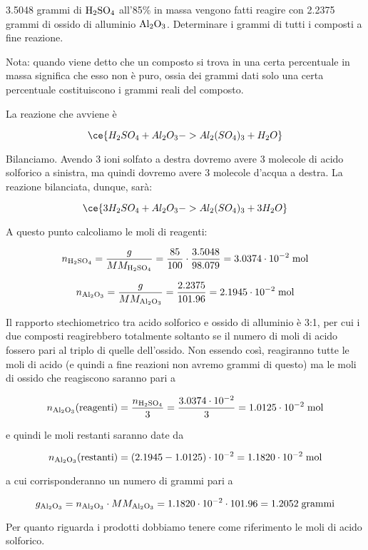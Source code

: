 \begin{esercizio}
    3.5048 grammi di $\rm H_2SO_4$ all'85\% in massa vengono fatti reagire con 2.2375 grammi di ossido di alluminio $\rm Al_2O_3$. Determinare i grammi di tutti i composti a fine reazione.
\end{esercizio}
\begin{soluzione}
    Nota: quando viene detto che un composto si trova in una certa percentuale in massa significa che esso non è puro, ossia dei grammi dati solo una certa percentuale costituiscono i grammi reali del composto.

\vspace{0.2cm}La reazione che avviene è

$$\ce{H_2SO_4 + Al_2O_3 -> Al_2(SO_4)_3 + H_2O}$$

Bilanciamo. Avendo 3 ioni solfato a destra dovremo avere 3 molecole di acido solforico a sinistra, ma quindi dovremo avere 3 molecole d'acqua a destra. La reazione bilanciata, dunque, sarà:

$$\ce{3H_2SO_4 + Al_2O_3 -> Al_2(SO_4)_3 + 3H_2O}$$

A questo punto calcoliamo le moli di reagenti:

$$n_{\rm H_2SO_4}=\frac{g}{MM_{\rm H_2SO_4}}
=\frac{85}{100} \cdot \frac{3.5048}{98.079}=3.0374 \cdot 10^{-2} \; \rm mol$$

$$n_{\rm Al_2O_3}=\frac{g}{MM_{\rm Al_2O_3}}
=\frac{2.2375}{101.96}
=2.1945 \cdot 10^{-2} \; \rm mol$$

Il rapporto stechiometrico tra acido solforico e ossido di alluminio è 3:1, per cui i due composti reagirebbero totalmente soltanto se il numero di moli di acido fossero pari al triplo di quelle dell'ossido. Non essendo così, reagiranno tutte le moli di acido (e quindi a fine reazioni non avremo grammi di questo) ma le moli di ossido che reagiscono saranno pari a

$$n_{\rm Al_2O_3}(\text{reagenti})
=\frac{n_{\rm H_2SO_4}}{3}
=\frac{3.0374 \cdot 10^{-2}}{3}
=1.0125 \cdot 10^{-2} \; \rm mol$$

e quindi le moli restanti saranno date da

$$n_{\rm Al_2O_3}(\text{restanti})
=(2.1945 - 1.0125) \cdot 10^{-2}
=1.1820 \cdot 10^{-2} \; \rm mol$$

a cui corrisponderanno un numero di grammi pari a

$$g_{\rm Al_2O_3}=n_{\rm Al_2O_3} \cdot MM_{\rm Al_2O_3}
=1.1820 \cdot 10^{-2} \cdot 101.96
=1.2052 \; \rm grammi$$

Per quanto riguarda i prodotti dobbiamo tenere come riferimento le moli di acido solforico.


\end{soluzione}
